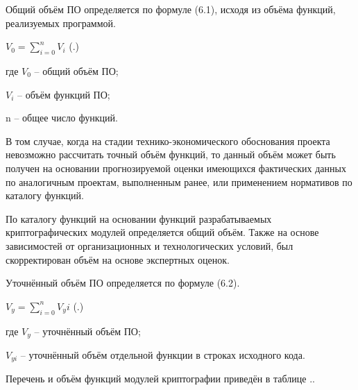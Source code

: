 \subtitlespace

{\gostFont
	
	\par \redline Общий объём ПО определяется по формуле (6.1), исходя из объёма функций, реализуемых программой. 
	
	\formulaspace
	\par \redline $ V_0=\sum_{i=0}^{n}V_i$ \hfill (\thechaptercntr .\theformulacntr) \redline
	\formulaspace \addtocounter{formulacntr}{1}

	\par \redline где $V_0$ {--} общий объём ПО;
	
	\par \redline \wherespace $V_i$ {--} объём функций ПО;
	
	\par \redline \wherespace n {--} общее число функций.
	
	\par \redline В том случае, когда на стадии технико-экономического обоснования проекта невозможно рассчитать точный объём функций, то данный объём может быть получен на основании прогнозируемой оценки имеющихся фактических данных по аналогичным проектам, выполненным ранее, или применением нормативов по каталогу функций.
	
	\par \redline По каталогу функций на основании функций разрабатываемых криптографических модулей определяется общий объём. Также на основе зависимостей от организационных и технологических условий, был скорректирован объём на основе экспертных оценок.
	
	\par \redline Уточнённый объём ПО определяется по формуле (6.2).
	
	\formulaspace
	\par \redline $V_y=\sum_{i=0}^{n}V_yi$ \hfill (\thechaptercntr .\theformulacntr) \redline
	\formulaspace \addtocounter{formulacntr}{1}
	
	\par \redline где \wherespace $V_y$ {--} уточнённый объём ПО;
	
	\par \redline \wherespace $V_{yi}$ {--} уточнённый объём отдельной функции в строках исходного кода.
	
	\par \redline Перечень и объём функций модулей криптографии приведён в таблице \thechaptercntr .\thetablecntr .

	\par \redline \par \redline

}
